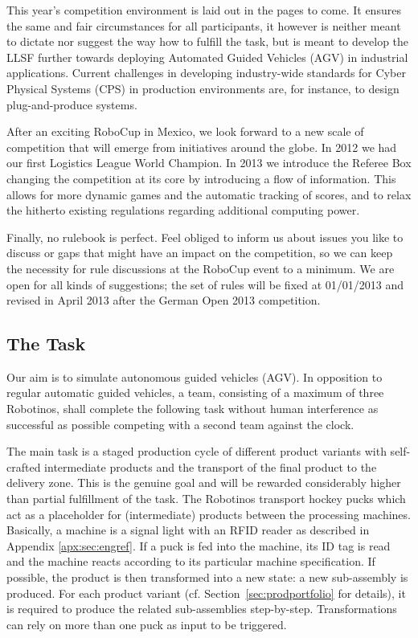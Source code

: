 \documentclass[12pt,twoside]{article}
\newcommand{\refsec}[1]{Section~\ref{#1}}
\begin{document}
This year's competition environment is laid out in the pages to come.
It ensures the same and fair circumstances for all participants, it
however is neither meant to dictate nor suggest the way how to fulfill
the task, but is meant to develop the LLSF further towards deploying
Automated Guided Vehicles (AGV) in industrial applications. Current
challenges in developing industry-wide standards for Cyber Physical
Systems (CPS) in production environments are, for instance, to design
plug-and-produce systems.

After an exciting RoboCup in Mexico, we look forward to a new scale of
competition that will emerge from initiatives around the globe. In
2012 we had our first Logistics League World Champion.  In 2013 we
introduce the Referee Box changing the competition at its core by
introducing a flow of information.  This allows for more dynamic games
and the automatic tracking of scores, and to relax the hitherto
existing regulations regarding additional computing power.

Finally, no rulebook is perfect. Feel obliged to inform us about
issues you like to discuss or gaps that might have an impact on the
competition, so we can keep the necessity for rule discussions at the
RoboCup event to a minimum. We are open for all kinds of suggestions;
the set of rules will be fixed at 01/01/2013 and revised in April 2013
after the German Open 2013 competition.

\subsection{The Task}
\label{sec:task}

Our aim is to simulate autonomous guided vehicles (AGV). In opposition
to regular automatic guided vehicles, a team, consisting of a maximum
of three Robotinos, shall complete the following task without human
interference as successful as possible competing with a second team
against the clock.

The main task is a staged production cycle of different product
variants with self-crafted intermediate products and the transport of
the final product to the delivery zone. This is the genuine goal and
will be rewarded considerably higher than partial fulfillment of the
task. The Robotinos transport hockey pucks which act as a placeholder
for (intermediate) products between the processing
machines. Basically, a machine is a signal light with an RFID reader
as described in Appendix \ref{apx:sec:engref}. If a puck is fed into
the machine, its ID tag is read and the machine reacts according to
its particular machine specification. If possible, the product is then
transformed into a new state: a new sub-assembly is produced. For each
product variant (cf. \refsec{sec:prodportfolio} for details), it is
required to produce the related sub-assemblies
step-by-step. Transformations can rely on more than one puck as input
to be triggered.
\end{document}
